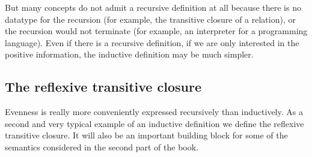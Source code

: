 \begin{isabellebody}
\begin{isamarkuptext}
But many concepts do not admit a recursive definition at all because there is
no datatype for the recursion (for example, the transitive closure of a
relation), or the recursion would not terminate (for example,
an interpreter for a programming language). Even if there is a recursive
definition, if we are only interested in the positive information, the
inductive definition may be much simpler.

\subsection{The reflexive transitive closure}
\label{sec:star}

Evenness is really more conveniently expressed recursively than inductively.
As a second and very typical example of an inductive definition we define the
reflexive transitive closure.
\sem
It will also be an important building block for
some of the semantics considered in the second part of the book.
\endsem


\end{isamarkuptext}
\end{isabellebody}
